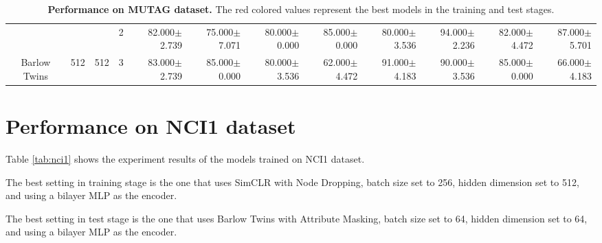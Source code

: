 \begin{table}[htpb]
{\begin{tabular}{c|c|c|c|rr|rr|rr|rr}
                                 &                                                                                 &                                                                                        & 2                                                                                         & 82.000$\pm$2.739                        & 75.000$\pm$7.071                        & 80.000$\pm$0.000                        & 85.000$\pm$0.000                        & 80.000$\pm$3.536                         & 94.000$\pm$2.236                         & 82.000$\pm$4.472                        & 87.000$\pm$5.701                       \\
\multirow{-12}{*}{Barlow Twins}  & \multirow{-6}{*}{512}                                                           & \multirow{-3}{*}{512}                                                                  & 3                                                                                         & 83.000$\pm$2.739                        & 85.000$\pm$0.000                        & 80.000$\pm$3.536                        & 62.000$\pm$4.472                        & 91.000$\pm$4.183                         & 90.000$\pm$3.536                         & 85.000$\pm$0.000                        & 66.000$\pm$4.183                       \\ \hline
\end{tabular}
}
\caption[Performance on MUTAG dataset]{\textbf{Performance on MUTAG dataset.} The red colored values represent the best models in the training and test stages.}
		\label{tab:mutag}
\end{table}



\section{Performance on NCI1 dataset}

Table \ref{tab:nci1} shows the experiment results of the models trained on NCI1 dataset.


The best setting in training stage is the one that uses SimCLR with Node Dropping, batch size set to 256, hidden dimension set to 512, and using a bilayer MLP as the encoder.

The best setting in test stage is the one that uses Barlow Twins with Attribute Masking, batch size set to 64, hidden dimension set to 64, and using a bilayer MLP as the encoder.


